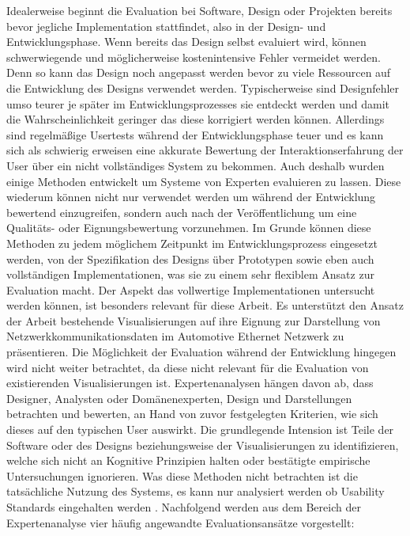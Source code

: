 \documentclass[draft=false
              ,paper=a4
              ,twoside=false
              ,fontsize=11pt
              ,headsepline
              ,BCOR10mm
              ,DIV11
              ]{scrbook}
\begin{document}
Idealerweise beginnt die Evaluation bei Software, Design oder Projekten bereits bevor jegliche Implementation stattfindet, also in der Design- und Entwicklungsphase. Wenn bereits das Design selbst evaluiert wird, können schwerwiegende und möglicherweise kostenintensive Fehler vermeidet werden. Denn so kann das Design noch angepasst werden bevor zu viele Ressourcen auf die Entwicklung des Designs verwendet werden.  Typischerweise sind Designfehler umso teurer je später im Entwicklungsprozesses sie entdeckt werden und damit die Wahrscheinlichkeit geringer das diese korrigiert werden können. Allerdings sind regelmäßige Usertests während der Entwicklungsphase teuer und es kann sich als schwierig erweisen eine akkurate Bewertung der Interaktionserfahrung der User über ein nicht vollständiges System zu bekommen. Auch deshalb wurden einige Methoden entwickelt um Systeme von Experten evaluieren zu lassen. Diese wiederum können nicht nur verwendet werden um während der Entwicklung bewertend einzugreifen, sondern auch nach der Veröffentlichung um eine Qualitäts- oder Eignungsbewertung vorzunehmen. Im Grunde können diese Methoden zu jedem möglichem Zeitpunkt im Entwicklungsprozess eingesetzt werden, von der Spezifikation des Designs über Prototypen sowie eben auch vollständigen Implementationen, was sie zu einem sehr flexiblem Ansatz zur Evaluation macht. Der Aspekt das  vollwertige Implementationen untersucht werden können, ist besonders relevant für diese Arbeit. Es unterstützt den Ansatz der Arbeit bestehende Visualisierungen auf ihre Eignung zur Darstellung von Netzwerkkommunikationsdaten im Automotive Ethernet Netzwerk zu präsentieren. Die Möglichkeit der Evaluation während der Entwicklung hingegen wird nicht weiter betrachtet, da diese nicht relevant für die Evaluation von existierenden Visualisierungen ist. Expertenanalysen hängen davon ab, dass Designer, Analysten oder Domänenexperten, Design und Darstellungen betrachten und bewerten, an Hand von zuvor festgelegten Kriterien,  wie sich dieses auf den typischen User auswirkt. Die grundlegende Intension ist Teile der Software oder des Designs beziehungsweise der Visualisierungen zu identifizieren, welche sich nicht an Kognitive Prinzipien halten oder bestätigte empirische Untersuchungen ignorieren. Was diese Methoden nicht betrachten ist die tatsächliche Nutzung des Systems, es kann nur analysiert werden ob Usability Standards eingehalten werden \cite{alan_dix_human-computer_2004}. 
Nachfolgend werden aus dem Bereich der Expertenanalyse vier häufig angewandte Evaluationsansätze vorgestellt: 
\end{document}
